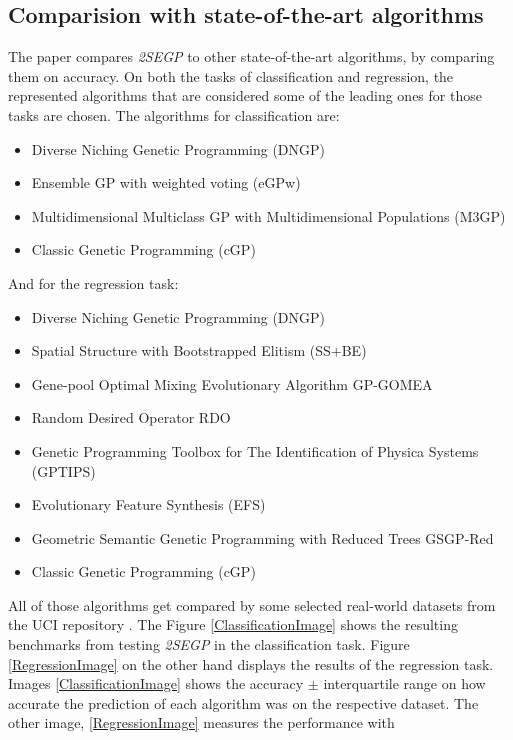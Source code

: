 \documentclass[tikz, runningheads]{llncs}
\begin{document}
\subsection{Comparision with state-of-the-art algorithms}
The paper \cite{GPoriginal} compares \textit{2SEGP} to other state-of-the-art algorithms, by comparing them on accuracy. 
On both the tasks of classification and regression, the represented algorithms that are considered some of the leading ones 
for those tasks are chosen. The algorithms for classification are:
\begin{itemize}
	\item Diverse Niching Genetic Programming (DNGP) \cite{DNGP}
	\item Ensemble GP with weighted voting (eGPw) \cite{EnsembleGeneticProgramming}
	\item Multidimensional Multiclass GP with Multidimensional Populations (M3GP) \cite{EnsembleGeneticProgramming}
	\item Classic Genetic Programming (cGP)
\end{itemize}
And for the regression task:
\begin{itemize}
	\item Diverse Niching Genetic Programming (DNGP) \cite{DNGP}
	\item Spatial Structure with Bootstrapped Elitism (SS+BE) \cite{SS+BE}
	\item Gene-pool Optimal Mixing Evolutionary Algorithm GP-GOMEA \cite{GP-GOMEA}
	\item Random Desired Operator RDO \cite{RDO}
	\item Genetic Programming Toolbox for The Identification of Physica Systems (GPTIPS) \cite{GPTIPS}
	\item Evolutionary Feature Synthesis (EFS) \cite{EFS}
	\item Geometric Semantic Genetic Programming with Reduced Trees GSGP-Red \cite{GSGP-Red}
	\item Classic Genetic Programming (cGP)
\end{itemize}
All of those algorithms get compared by some selected real-world datasets from the UCI repository \cite{UCI}. 
The Figure \ref{ClassificationImage} 
shows the resulting benchmarks from testing \textit{2SEGP} in the classification task. Figure \ref{RegressionImage} on the other hand 
displays the results of the regression task. Images \ref{ClassificationImage} shows the accuracy $\pm$ interquartile range on how accurate the 
prediction of each algorithm was on the respective dataset. The other image, \ref{RegressionImage} measures the performance with 
\end{document}
